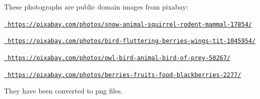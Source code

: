 These photographs are public domain images from pixabay\+:

\href{https://pixabay.com/photos/snow-animal-squirrel-rodent-mammal-17854/}{\texttt{ https\+://pixabay.\+com/photos/snow-\/animal-\/squirrel-\/rodent-\/mammal-\/17854/}}

\href{https://pixabay.com/photos/bird-fluttering-berries-wings-tit-1045954/}{\texttt{ https\+://pixabay.\+com/photos/bird-\/fluttering-\/berries-\/wings-\/tit-\/1045954/}}

\href{https://pixabay.com/photos/owl-bird-animal-bird-of-prey-50267/}{\texttt{ https\+://pixabay.\+com/photos/owl-\/bird-\/animal-\/bird-\/of-\/prey-\/50267/}}

\href{https://pixabay.com/photos/berries-fruits-food-blackberries-2277/}{\texttt{ https\+://pixabay.\+com/photos/berries-\/fruits-\/food-\/blackberries-\/2277/}}

They have been converted to png files. 